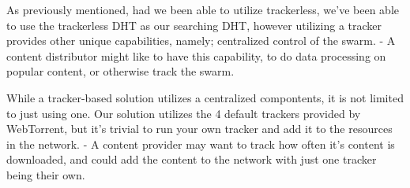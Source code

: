 As previously mentioned, had we been able to utilize trackerless, we've been
able to use the trackerless DHT as our searching DHT, however utilizing a
tracker provides other unique capabilities, namely; centralized control of the
swarm. 
\newline
- A content distributor might like to have this capability, to do data
processing on popular content, or otherwise track the swarm.

While a tracker-based solution utilizes a centralized compontents, it is not
limited to just using one. Our solution utilizes the 4 default trackers
provided by WebTorrent, but it's trivial to run your own tracker and add it to
the resources in the network.
\newline
- A content provider may want to track how often it's content is downloaded,
and could add the content to the network with just one tracker being their own.
